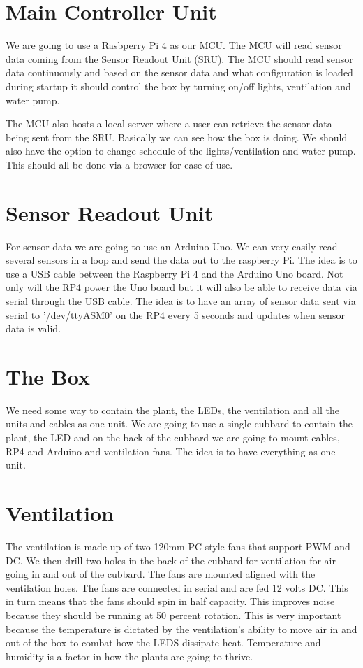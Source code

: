 \documentclass[a4paper,12pt,twoside,openright,titlepage]{book}
\begin{document}
\section{Main Controller Unit}

We are going to use a Rasbperry Pi 4 as our MCU. 
The MCU will read sensor data coming from the Sensor Readout Unit (SRU).
The MCU should read sensor data continuously and based on the sensor data and what configuration is loaded during startup it should control the box by turning on/off lights, ventilation and water pump.

The MCU also hosts a local server where a user can retrieve the sensor data being sent from the SRU. Basically we can see how the box is doing.
We should also have the option to change schedule of the lights/ventilation and water pump. This should all be done via a browser for ease of use.

\section{Sensor Readout Unit}

For sensor data we are going to use an Arduino Uno. We can very easily read several sensors in a loop and send the data out to the raspberry Pi. The idea is to use a USB cable between the Raspberry Pi 4 and the Arduino Uno board. Not only will the RP4 power the Uno board but it will also be able to receive data via serial through the USB cable. The idea is to have an array of sensor data sent via serial to '/dev/ttyASM0' on the RP4 every 5 seconds and updates when sensor data is valid.

\section{The Box}

We need some way to contain the plant, the LEDs, the ventilation and all the units and cables as one unit. We are going to use a single cubbard to contain the plant, the LED and on the back of the cubbard we are going to mount cables, RP4 and Arduino and ventilation fans. The idea is to have everything as one unit.

\section{Ventilation}
The ventilation is made up of two 120mm PC style fans that support PWM and DC.
We then drill two holes in the back of the cubbard for ventilation for air going in and out of the cubbard. The fans are mounted aligned with the ventilation holes. The fans are connected in serial and are fed 12 volts DC. This in turn means that the fans should spin in half capacity. This improves noise because they should be running at 50 percent rotation. This is very important because the temperature is dictated by the ventilation's ability to move air in and out of the box to combat how the LEDS dissipate heat. Temperature and humidity is a factor in how the plants are going to thrive.
\end{document}
